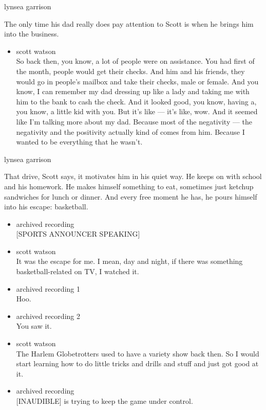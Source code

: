 lynsea garrison

The only time his dad really does pay attention to Scott is when he
brings him into the business.

\begin{itemize}
\tightlist
\item
  scott watson\\
  So back then, you know, a lot of people were on assistance. You had
  first of the month, people would get their checks. And him and his
  friends, they would go in people's mailbox and take their checks, male
  or female. And you know, I can remember my dad dressing up like a lady
  and taking me with him to the bank to cash the check. And it looked
  good, you know, having a, you know, a little kid with you. But it's
  like --- it's like, wow. And it seemed like I'm talking more about my
  dad. Because most of the negativity --- the negativity and the
  positivity actually kind of comes from him. Because I wanted to be
  everything that he wasn't.
\end{itemize}

lynsea garrison

That drive, Scott says, it motivates him in his quiet way. He keeps on
with school and his homework. He makes himself something to eat,
sometimes just ketchup sandwiches for lunch or dinner. And every free
moment he has, he pours himself into his escape: basketball.

\begin{itemize}
\item
  archived recording\\
  {[}SPORTS ANNOUNCER SPEAKING{]}
\item
  scott watson\\
  It was the escape for me. I mean, day and night, if there was
  something basketball-related on TV, I watched it.
\item
  archived recording 1\\
  Hoo.
\item
  archived recording 2\\
  You saw it.
\item
  scott watson\\
  The Harlem Globetrotters used to have a variety show back then. So I
  would start learning how to do little tricks and drills and stuff and
  just got good at it.
\item
  archived recording\\
  {[}INAUDIBLE{]} is trying to keep the game under control.
\end{itemize}

